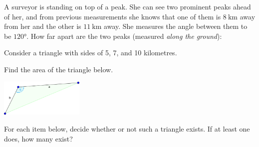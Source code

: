 \begin{questions}

  \question A surveyor is standing on top of a peak. She can see two prominent peaks ahead of her, and from previous measurements
            she knows that one of them is $ \SI{8}{\kilo\metre} $ away from her and the other is $ \SI{11}{\kilo\metre} $ away. She
            measures the angle between them to be $ \ang{120} $. How far apart are the two peaks (measured \emph{along the ground}):
  \question Consider a triangle with sides of 5, 7, and 10 kilometres.
  \question Find the area of the triangle below.
            \begin{center}
              \includegraphics[width=0.3\textwidth]{triarea}
            \end{center}
  \question For each item below, decide whether or not such a triangle exists. If at least one does, how many exist?
    \begin{parts}

\end{parts}
\end{questions}
